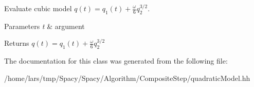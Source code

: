 Evaluate cubic model $ q(t) = q_1(t) + \frac{\omega}{6}q_2^{3/2} $. 


\begin{DoxyParams}{Parameters}
{\em t} & argument \\
\hline
\end{DoxyParams}
\begin{DoxyReturn}{Returns}
$ q(t) = q_1(t) + \frac{\omega}{6}q_2^{3/2} $ 
\end{DoxyReturn}


The documentation for this class was generated from the following file\+:\begin{DoxyCompactItemize}
\item 
/home/lars/tmp/\+Spacy/\+Spacy/\+Algorithm/\+Composite\+Step/quadratic\+Model.\+hh\end{DoxyCompactItemize}
